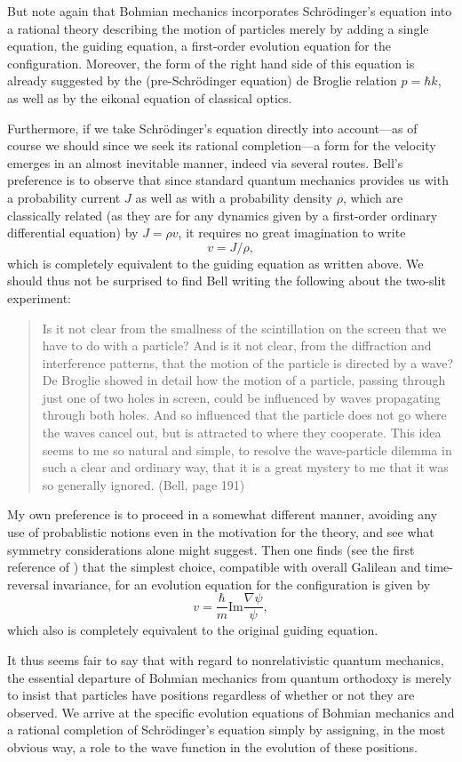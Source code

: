 \documentclass[12pt]{article}
\newcommand\bq{\begin{quotation}}
\newcommand\eq{\end{quotation}}
\begin{document}
But note again that Bohmian mechanics incorporates Schr\"odinger's equation
into a rational theory describing the motion of particles merely by adding
a single equation, the guiding equation, a first-order evolution equation
for the configuration. Moreover, the form of the right hand side of this
equation is already suggested by the (pre-Schr\"odinger equation) de
Broglie relation $p=\hbar k$, as well as by the eikonal equation of
classical optics.

Furthermore, if we take Schr\"odinger's equation directly into account---as
of course we should since we seek its rational completion---a form for the
velocity emerges in an almost inevitable manner, indeed via several routes.
Bell's preference is to observe that since standard quantum mechanics
provides us with a probability current $J$ as well as with a probability
density $\rho$, which are classically related (as they are for any dynamics
given by a first-order ordinary differential equation) by $J=\rho v$, it
requires no great imagination to write $$v=J/\rho,$$ which is completely
equivalent to the guiding equation as written above. We should thus not be
surprised to find Bell writing the following about the two-slit experiment:
\bq \noindent Is it not clear from the smallness of the scintillation on
the screen that we have to do with a particle? And is it not clear, from
the diffraction and interference patterns, that the motion of the particle
is directed by a wave? De Broglie showed in detail how the motion of a
particle, passing through just one of two holes in screen, could be
influenced by waves propagating through both holes.    And so influenced
that the particle does not go where the waves cancel out, but is attracted
to where they cooperate. This idea seems to me so natural and simple, to
resolve the wave-particle dilemma  in such a clear and ordinary way, that
it is a great mystery to me that it was so generally ignored. (Bell, page 191)
\eq


My own preference is to proceed in a somewhat different manner, avoiding
any use of probablistic notions even in the motivation for the theory, and
see what symmetry considerations alone might suggest. Then one finds (see
the first reference of \cite{DGZ})
that the simplest choice, compatible with overall Galilean and
time-reversal invariance, for an evolution equation for the configuration
is given by $$v=\frac {\hbar}m\mbox {Im}\frac{\nabla \psi}{\psi},$$ which
also is completely equivalent to the original guiding equation.

It thus seems fair to say that with regard to nonrelativistic quantum
mechanics, the essential departure of Bohmian mechanics from quantum
orthodoxy is merely to insist that particles have positions regardless of
whether or not they are observed. We arrive at the specific evolution
equations of Bohmian mechanics and a rational completion of Schr\"odinger's
equation simply by assigning, in the most obvious way, a role to the wave
function in the evolution of these positions.
\end{document}
